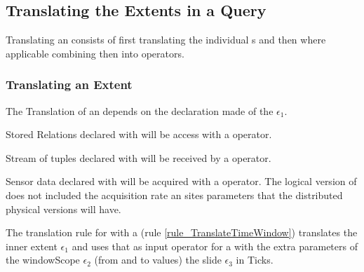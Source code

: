 \subsection{Translating the Extents in a Query}
\label{sec_extentListTraanslate}

Translating an  consists of first translating the individual s and then where applicable combining then into  operators.

\subsubsection{Translating an Extent}
The Translation of an  depends on the  declaration made of the  $\epsilon_1$. 
 
Stored Relations declared with  will be access with a  operator.


Stream of tuples declared with  will be received by a  operator.


Sensor data declared with  will be acquired with a  operator.
The logical version of  does not included the acquisition rate an sites parameters that the distributed physical versions will have. 

              
The translation rule for  with a  (rule \ref{rule_TranslateTimeWindow}) translates the inner extent $\epsilon_1$ and uses that as input operator  for a  with the extra parameters of the windowScope $\epsilon_2$ (from and to values) the slide $\epsilon_3$ in Ticks.         

